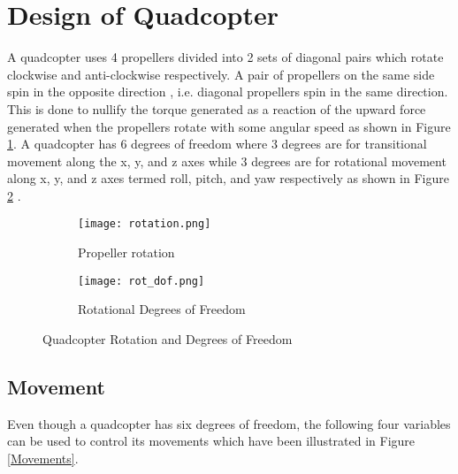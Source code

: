 \documentclass[10pt, a4paper]{article}
\newcommand{\fig}[1]{Figure \ref{#1}}
\begin{document}
\section{Design of Quadcopter}
    A quadcopter uses 4 propellers divided into 2 sets of diagonal pairs which rotate clockwise and anti-clockwise respectively. A pair of propellers on the same side spin in the opposite direction , i.e. diagonal propellers spin in the same direction. This is done to nullify the torque generated as a reaction of the upward force generated when the propellers rotate with some angular speed as shown in \fig{rotate}. A quadcopter has 6 degrees of freedom where 3 degrees are for transitional movement along the x, y, and z axes while 3 degrees are for rotational movement along x, y, and z axes termed roll, pitch, and yaw respectively as shown in \fig{rot_DOF} \cite{IIJEM}.
    
    \begin{figure}[hbt!]
        \centering
        \begin{subfigure}[b]{0.51\textwidth}
            \centering
            \texttt{[image: rotation.png]}
            \caption{Propeller rotation}
            \label{rotate}
        \end{subfigure}
        \hfill
        \begin{subfigure}[b]{0.41\textwidth}
            \centering
            \texttt{[image: rot\_dof.png]}
            \caption{Rotational Degrees of Freedom}
            \label{rot_DOF}        
        \end{subfigure}
        \caption{Quadcopter Rotation and Degrees of Freedom \cite{book}}
        \label{DOF}
    \end{figure}
    
    \subsection{Movement}
    Even though a quadcopter has six degrees of freedom, the following four variables can be used to control its movements \cite{book} which have been illustrated in \fig{Movements}.
\end{document}
